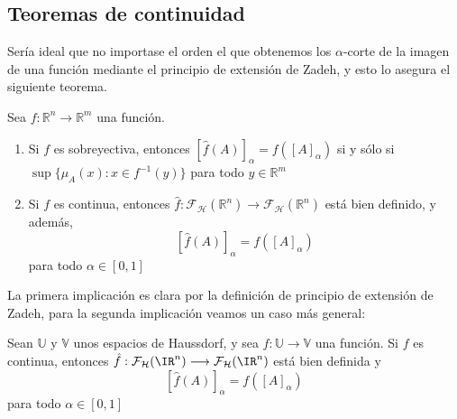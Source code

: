 \subsection{Teoremas de continuidad}
Sería ideal que no importase el orden el que obtenemos los $\alpha$-corte de la imagen de una función mediante el principio de extensión de Zadeh, y esto lo asegura el siguiente teorema.

\begin{teorema}
	Sea $f : \mathbb{R}^n \longrightarrow \mathbb{R}^m$ una función.
	\begin{enumerate}
		\item Si $f$ es sobreyectiva, entonces $[\hat{f}(A)]_\alpha = f([A]_\alpha)$ si y sólo si $\sup\{\mu_A(x) : x \in f^{-1}(y)\}$ para todo $y \in \mathbb{R}^m$
		\item Si $f$ es continua, entonces $\hat{f} : \mathcal{F}_\mathcal{H}(\mathbb{R}^n) \longrightarrow \mathcal{F}_\mathcal{H}(\mathbb{R}^n)$ está bien definido, y además,  
		$$[\hat{f}(A)]_\alpha = f([A]_\alpha)$$
		para todo $\alpha \in [0, 1]$
	\end{enumerate}
\end{teorema}

La primera implicación es clara por la definición de principio de extensión de Zadeh, para la segunda implicación veamos un caso más general:


\begin{teorema}
	Sean $\mathbb{U}$ y $\mathbb{V}$ unos espacios de Haussdorf, y sea $f: \mathbb{U} \longrightarrow \mathbb{V}$ una función. Si $f$ es continua, entonces  $\hat{f} : \mathcal{F}_\mathcal{H}(\IR^n) \longrightarrow \mathcal{F}_\mathcal{H}(\IR^n)$ está bien definida y $$[\hat{f}(A)]_\alpha = f([A]_\alpha)$$
	para todo $\alpha \in [0, 1]$
\end{teorema}

